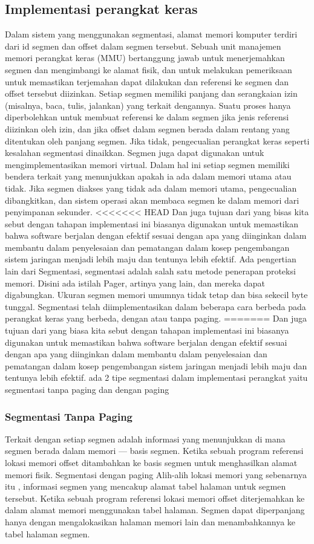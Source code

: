 \subsection{Implementasi perangkat keras}
Dalam sistem yang menggunakan segmentasi, alamat memori komputer terdiri dari id segmen dan offset dalam segmen tersebut. Sebuah unit manajemen memori perangkat keras (MMU) bertanggung jawab untuk menerjemahkan segmen dan mengimbangi ke alamat fisik, dan untuk melakukan pemeriksaan untuk memastikan terjemahan dapat dilakukan dan referensi ke segmen dan offset tersebut diizinkan.
Setiap segmen memiliki panjang dan serangkaian izin (misalnya, baca, tulis, jalankan) yang terkait dengannya. Suatu proses hanya diperbolehkan untuk membuat referensi ke dalam segmen jika jenis referensi diizinkan oleh izin, dan jika offset dalam segmen berada dalam rentang yang ditentukan oleh panjang segmen. Jika tidak, pengecualian perangkat keras seperti kesalahan segmentasi dinaikkan.
Segmen juga dapat digunakan untuk mengimplementasikan memori virtual. Dalam hal ini setiap segmen memiliki bendera terkait yang menunjukkan apakah ia ada dalam memori utama atau tidak. Jika segmen diakses yang tidak ada dalam memori utama, pengecualian dibangkitkan, dan sistem operasi akan membaca segmen ke dalam memori dari penyimpanan sekunder.
<<<<<<< HEAD
Dan juga tujuan dari yang bisas kita sebut dengan tahapan implementasi ini biasanya digunakan untuk memastikan bahwa software berjalan dengan efektif sesuai dengan apa yang diinginkan dalam membantu dalam penyelesaian dan pematangan dalam kosep pengembangan sistem jaringan menjadi lebih maju dan tentunya lebih efektif.
Ada pengertian lain dari Segmentasi, segmentasi  adalah salah satu metode penerapan proteksi memori. Disini ada istilah  Pager, artinya yang lain, dan mereka dapat digabungkan. Ukuran segmen memori umumnya tidak tetap dan bisa sekecil byte tunggal. 
Segmentasi telah diimplementasikan dalam beberapa cara berbeda pada perangkat keras yang berbeda, dengan atau tanpa paging. 
=======
Dan juga tujuan dari yang biasa kita sebut dengan tahapan implementasi ini biasanya digunakan untuk memastikan bahwa software berjalan dengan efektif sesuai dengan apa yang diinginkan dalam membantu dalam penyelesaian dan pematangan dalam kosep pengembangan sistem jaringan menjadi lebih maju dan tentunya lebih efektif. ada 2 tipe segmentasi dalam implementasi perangkat yaitu segmentasi tanpa paging dan dengan paging
\subsubsection{Segmentasi Tanpa Paging}
Terkait dengan setiap segmen adalah informasi yang menunjukkan di mana segmen berada dalam memori — basis segmen. Ketika sebuah program referensi lokasi memori offset ditambahkan ke basis segmen untuk menghasilkan alamat memori fisik.
Segmentasi dengan paging
Alih-alih lokasi memori yang sebenarnya itu , informasi segmen yang mencakup alamat tabel halaman untuk segmen tersebut. Ketika sebuah program referensi lokasi memori offset diterjemahkan ke dalam alamat memori menggunakan tabel halaman. Segmen dapat diperpanjang hanya dengan mengalokasikan halaman memori lain dan menambahkannya ke tabel halaman segmen.

